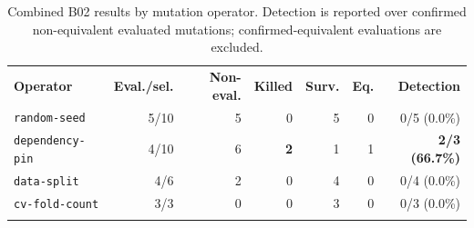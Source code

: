 \begin{table}[t]
\centering
\caption{Combined B02 results by mutation operator. Detection is reported over confirmed non-equivalent evaluated mutations; confirmed-equivalent evaluations are excluded.}
\label{tab:operator-results}
\vspace{0.35em}
\small
\renewcommand{\arraystretch}{1.24}
\setlength{\tabcolsep}{6pt}
\begin{tabular}{lrrrrrr}
\toprule
\addlinespace[2pt]
\textbf{Operator} & \textbf{Eval./sel.} & \textbf{Non-eval.} & \textbf{Killed} & \textbf{Surv.} & \textbf{Eq.} & \textbf{Detection} \\
\addlinespace[2pt]
\midrule
\addlinespace[3pt]
\texttt{random-seed} & 5/10 & 5 & 0 & 5 & 0 & 0/5 (0.0\%) \\
\addlinespace[3pt]
\texttt{dependency-pin} & 4/10 & 6 & \textbf{2} & 1 & 1 & \textbf{2/3 (66.7\%)} \\
\addlinespace[3pt]
\texttt{data-split} & 4/6 & 2 & 0 & 4 & 0 & 0/4 (0.0\%) \\
\addlinespace[3pt]
\texttt{cv-fold-count} & 3/3 & 0 & 0 & 3 & 0 & 0/3 (0.0\%) \\
\addlinespace[3pt]
\bottomrule
\end{tabular}
\vspace{0.25em}
\end{table}

